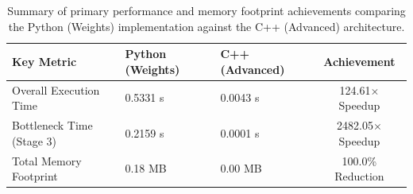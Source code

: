 \begin{table}
\caption{Summary of primary performance and memory footprint achievements comparing the Python (Weights) implementation against the C++ (Advanced) architecture.}
\label{tab:master_summary}
\begin{tabular}{lllc}
\toprule
\textbf{Key Metric} & \textbf{Python (Weights)} & \textbf{C++ (Advanced)} & \textbf{Achievement} \\
\midrule
Overall Execution Time & 0.5331 s & 0.0043 s & 124.61$\times$ Speedup \\
Bottleneck Time (Stage 3) & 0.2159 s & 0.0001 s & 2482.05$\times$ Speedup \\
Total Memory Footprint & 0.18 MB & 0.00 MB & 100.0\% Reduction \\
\bottomrule
\end{tabular}
\end{table}
